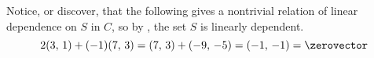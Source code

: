 Notice, or discover, that the following gives a nontrivial relation of linear dependence on $S$ in $C$, so by , the set $S$ is linearly dependent.
%
\begin{equation*}
2(3,\,1)+(-1)(7,\,3)=(7,\,3)+(-9,\,-5)=(-1,\,-1)=\zerovector
\end{equation*}
%